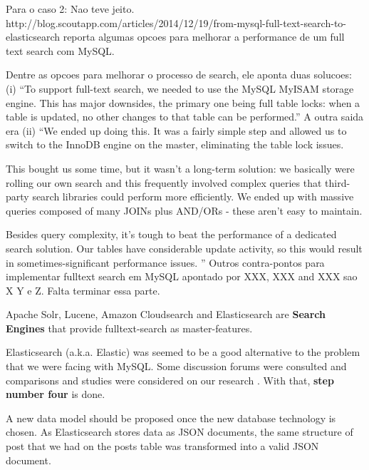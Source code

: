 	
Para o caso 2: 
	Nao teve jeito. 
	http://blog.scoutapp.com/articles/2014/12/19/from-mysql-full-text-search-to-elasticsearch reporta algumas opcoes para melhorar a performance de um full text search com MySQL. 

	Dentre as opcoes para melhorar o processo de search, ele aponta duas solucoes: (i) ``To support full-text search, we needed to use the MySQL MyISAM storage engine. This has major downsides, the primary one being full table locks: when a table is updated, no other changes to that table can be performed.'' A outra saida era (ii) ``We ended up doing this. It was a fairly simple step and allowed us to switch to the InnoDB engine on the master, eliminating the table lock issues.

	This bought us some time, but it wasn't a long-term solution: we basically were rolling our own search and this frequently involved complex queries that third-party search libraries could perform more efficiently. We ended up with massive queries composed of many JOINs plus AND/ORs - these aren't easy to maintain.

	Besides query complexity, it's tough to beat the performance of a dedicated search solution. Our tables have considerable update activity, so this would result in sometimes-significant performance issues.
	''
	Outros contra-pontos para implementar fulltext search em MySQL apontado por XXX, XXX and XXX sao X Y e Z. Falta terminar essa parte.

	Apache Solr, Lucene, Amazon Cloudsearch and Elasticsearch are \textbf{Search Engines} that provide fulltext-search as master-features. 

	Elasticsearch (a.k.a. Elastic) was seemed to be a good alternative to the problem that we were facing with MySQL. Some discussion forums were consulted and comparisons and studies were considered on our research \cite{StackOverflowElastic} \cite{SolrVsES} \cite{quoraES}. With that, \textbf{step number four} is done. 

	A new data model should be proposed once the new database technology is chosen. As Elasticsearch stores data as JSON documents, the same structure of post that we had on the posts table was transformed into a valid JSON document.























